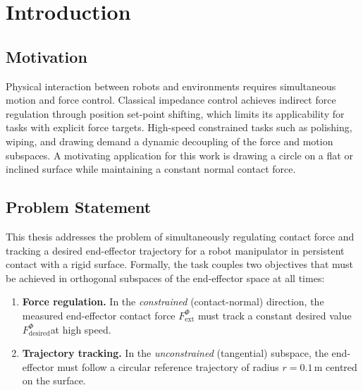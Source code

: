 \documentclass[
	german,%
	accentcolor=9c,%
	ruledheaders=section,%
	class=report,%
	thesis={type=bachelor},%
	fontsize=11pt,%
	parskip=half-,%
	custommargins=true,%
	marginpar=false,%
]{tudapub}
\begin{document}
\chapter{Introduction}

\section{Motivation}


Physical interaction between robots and environments requires simultaneous
motion and force control. Classical impedance control achieves indirect force
regulation through position set-point shifting, which limits its applicability
for tasks with explicit force targets. High-speed constrained tasks such as
polishing, wiping, and drawing demand a dynamic decoupling of the force and
motion subspaces. A motivating application for this work is drawing a circle
on a flat or inclined surface while maintaining a constant normal contact force.


\section{Problem Statement}

This thesis addresses the problem of simultaneously regulating contact force
and tracking a desired end-effector trajectory for a robot manipulator in
persistent contact with a rigid surface.
Formally, the task couples two objectives that must be achieved in orthogonal
subspaces of the end-effector space at all times:

\begin{enumerate}
    \item \textbf{Force regulation.}
          In the \emph{constrained} (contact-normal) direction, the measured
          end-effector contact force $F^\Phi_\text{ext}$ must track a constant
          desired value $F^\Phi_\text{desired}$at high speed.
    \item \textbf{Trajectory tracking.}
          In the \emph{unconstrained} (tangential) subspace,
          the end-effector must follow a circular reference trajectory of
          radius $r = 0.1\,\mathrm{m}$ centred on the surface.
\end{enumerate}
\end{document}
